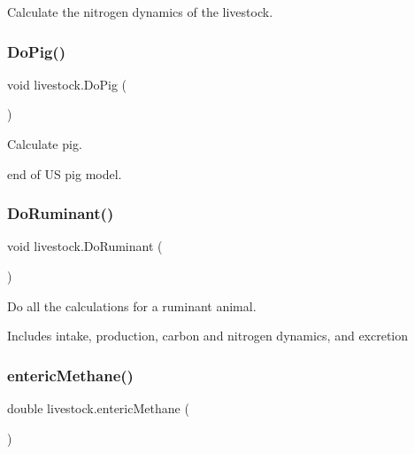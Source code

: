 Calculate the nitrogen dynamics of the livestock. 

\mbox{\label{classlivestock_a4d2339d509e3977e72d2299f6b13a6c1}} 
\subsubsection{\texorpdfstring{DoPig()}{DoPig()}}
{\footnotesize\ttfamily void livestock.\+Do\+Pig (\begin{DoxyParamCaption}{ }\end{DoxyParamCaption})\hspace{0.3cm}{\ttfamily [inline]}}



Calculate pig. 

end of US pig model. \mbox{\label{classlivestock_aae915d09f0a2e9cb020a6fb59335437a}} 
\subsubsection{\texorpdfstring{DoRuminant()}{DoRuminant()}}
{\footnotesize\ttfamily void livestock.\+Do\+Ruminant (\begin{DoxyParamCaption}{ }\end{DoxyParamCaption})\hspace{0.3cm}{\ttfamily [inline]}}



Do all the calculations for a ruminant animal. 

Includes intake, production, carbon and nitrogen dynamics, and excretion \mbox{\label{classlivestock_afc3c7bb93fede893404fb7d5d8daa0e3}} 
\subsubsection{\texorpdfstring{entericMethane()}{entericMethane()}}
{\footnotesize\ttfamily double livestock.\+enteric\+Methane (\begin{DoxyParamCaption}{ }\end{DoxyParamCaption})\hspace{0.3cm}{\ttfamily [inline]}}



